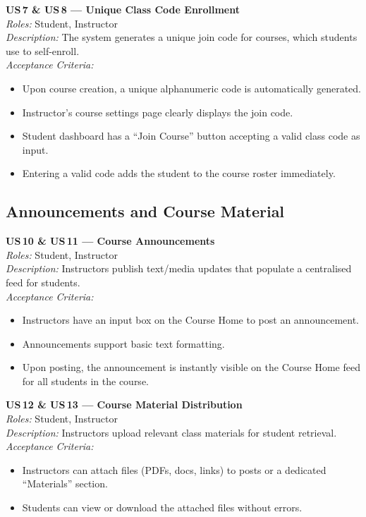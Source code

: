 \documentclass[12pt, a4paper]{article}
\begin{document}
\begin{userstory}
  \textbf{US\,7 \& US\,8 — Unique Class Code Enrollment}\\[4pt]
  \textit{Roles:} Student, Instructor\\[2pt]
  \textit{Description:} The system generates a unique join code for courses,
  which students use to self-enroll.\\[4pt]
  \textit{Acceptance Criteria:}
  \begin{itemize}
    \item Upon course creation, a unique alphanumeric code is automatically
          generated.
    \item Instructor's course settings page clearly displays the join code.
    \item Student dashboard has a ``Join Course'' button accepting a valid
          class code as input.
    \item Entering a valid code adds the student to the course roster
          immediately.
  \end{itemize}
\end{userstory}

\subsection{Announcements and Course Material}

\begin{userstory}
  \textbf{US\,10 \& US\,11 — Course Announcements}\\[4pt]
  \textit{Roles:} Student, Instructor\\[2pt]
  \textit{Description:} Instructors publish text/media updates that populate
  a centralised feed for students.\\[4pt]
  \textit{Acceptance Criteria:}
  \begin{itemize}
    \item Instructors have an input box on the Course Home to post an
          announcement.
    \item Announcements support basic text formatting.
    \item Upon posting, the announcement is instantly visible on the Course
          Home feed for all students in the course.
  \end{itemize}
\end{userstory}

\begin{userstory}
  \textbf{US\,12 \& US\,13 — Course Material Distribution}\\[4pt]
  \textit{Roles:} Student, Instructor\\[2pt]
  \textit{Description:} Instructors upload relevant class materials for
  student retrieval.\\[4pt]
  \textit{Acceptance Criteria:}
  \begin{itemize}
    \item Instructors can attach files (PDFs, docs, links) to posts or a
          dedicated ``Materials'' section.
    \item Students can view or download the attached files without errors.
  \end{itemize}
\end{userstory}
\end{document}
